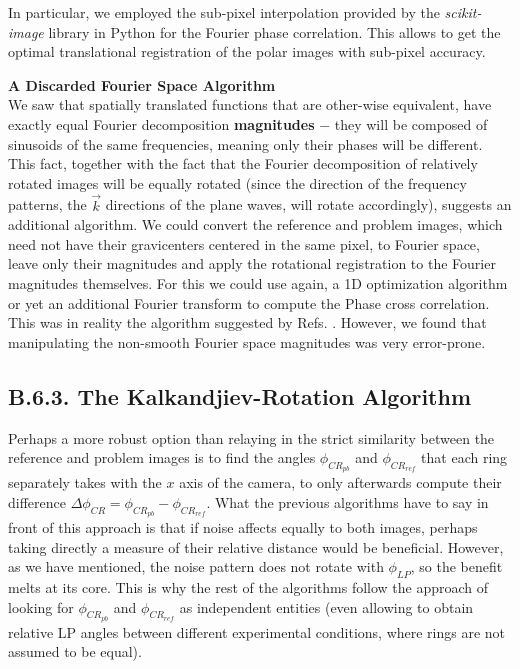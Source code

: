 \documentclass[11pt, a4paper, twoside]{article} %
\DeclareRobustCommand{\mybox}[2][gray!10]{%
\begin{tcolorbox}[   %
        left=0.2cm,
        right=0.2cm,
        top=0.15cm,
        bottom=0.15cm,
        colback=#1,
        colframe=#1,
        width=\dimexpr\textwidth\relax, 
        enlarge left by=0mm,
        boxsep=5pt,
        arc=0pt,outer arc=0pt,
        ]
        #2
\end{tcolorbox}
}
\begin{document}
In particular, we employed the sub-pixel interpolation provided by the {\em scikit-image} library in Python \cite{skimage} for the Fourier phase correlation. This allows to get the optimal translational registration of the polar images with sub-pixel accuracy.



\mybox{{\bf A Discarded Fourier Space Algorithm\vspace{0.13cm} \\}
We saw that spatially translated functions that are other-wise equivalent, have exactly equal Fourier decomposition {\bf magnitudes} $-$ they will be composed of sinusoids of the same frequencies, meaning only their phases will be different. This fact, together with the fact that the Fourier decomposition of relatively rotated images will be equally rotated (since the direction of the frequency patterns, the $\vec{k}$ directions of the plane waves, will rotate accordingly), suggests an additional algorithm. We could convert the reference and problem images, which need not have their gravicenters centered in the same pixel, to Fourier space, leave only their magnitudes and apply the rotational registration to the Fourier magnitudes themselves. For this we could use again, a 1D optimization algorithm or yet an additional Fourier transform to compute the Phase cross correlation. This was in reality the algorithm suggested by Refs. \cite{phase,phase2}. However, we found that manipulating the non-smooth Fourier space magnitudes was very error-prone.
}\vspace{-0.2cm}

\subsection*{B.6.3. The Kalkandjiev-Rotation Algorithm}
Perhaps a more robust option than relaying in the strict similarity between the reference and problem images is to find the angles $\phi_{CR_{pb}}$ and $\phi_{CR_{ref}}$ that each ring separately takes with the $x$ axis of the camera, to only afterwards compute their difference $\Delta \phi_{CR}=\phi_{CR_{pb}}-\phi_{CR_{ref}}$. What the previous algorithms have to say in front of this approach is that if noise affects equally to both images, perhaps taking directly a measure of their relative distance would be beneficial. However, as we have mentioned, the noise pattern does not rotate with $\phi_{LP}$, so the benefit melts at its core. This is why the rest of the algorithms follow the approach of looking for $\phi_{CR_{pb}}$ and $\phi_{CR_{ref}}$ as independent entities (even allowing to obtain relative LP angles between different experimental conditions, where rings are not assumed to be equal).
\end{document}
